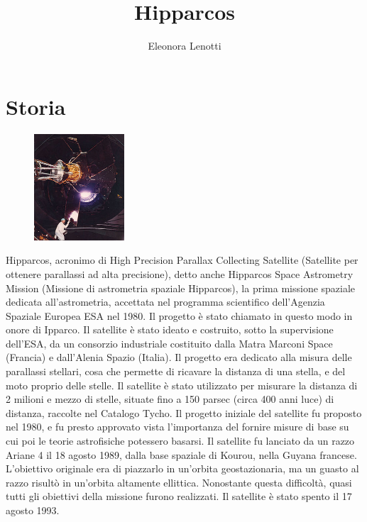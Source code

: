 \documentclass[12pt,a4paper]{article}
\begin{document}
\title{\vspace{-70pt}Hipparcos}
\author{Eleonora Lenotti}
\date{}
\maketitle
\pagestyle{empty}
\thispagestyle{empty}


\section*{Storia}
\label{storia}
\begin{figure}
  \vspace{-10pt}
  \begin{center}
    \includegraphics[width=0.30\textwidth]{satellite}
  \end{center}
  \vspace{-20pt}
\end{figure}
Hipparcos, acronimo di High Precision Parallax Collecting Satellite (Satellite per ottenere parallassi ad alta precisione), detto anche Hipparcos Space Astrometry Mission (Missione di astrometria spaziale Hipparcos), la prima missione spaziale dedicata all'astrometria, accettata nel programma scientifico dell'Agenzia Spaziale Europea ESA nel 1980.
Il progetto è stato chiamato in questo modo in onore di Ipparco.
Il satellite è stato ideato e costruito, sotto la supervisione dell'ESA, da un consorzio industriale costituito dalla Matra Marconi Space (Francia) e dall'Alenia Spazio (Italia).
Il progetto era dedicato alla misura delle parallassi stellari, cosa che permette di ricavare la distanza di una stella, e del moto proprio delle stelle. Il satellite è stato utilizzato per misurare la distanza di 2 milioni e mezzo di stelle, situate fino a 150 parsec (circa 400 anni luce) di distanza, raccolte nel Catalogo Tycho.
Il progetto iniziale del satellite fu proposto nel 1980, e fu presto approvato vista l'importanza del fornire misure di base su cui poi le teorie astrofisiche potessero basarsi. Il satellite fu lanciato da un razzo Ariane 4 il 18 agosto 1989, dalla base spaziale di Kourou, nella Guyana francese. L'obiettivo originale era di piazzarlo in un'orbita geostazionaria, ma un guasto al razzo risultò in un'orbita altamente ellittica. Nonostante questa difficoltà, quasi tutti gli obiettivi della missione furono realizzati. Il satellite è stato spento il 17 agosto 1993.
\end{document}
